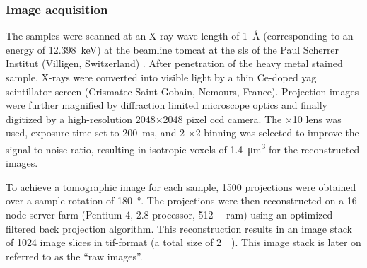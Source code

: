 \subsubsection{Image acquisition}
The samples were scanned at an X-ray wave-length of \SI{1}{\angstrom} (corresponding to an energy of \SI{12.398}{\kilo\electronvolt}) at the beamline \ac{tomcat} at the \acf{sls} of the Paul Scherrer Institut (Villigen, Switzerland) \cite{Stampanoni2002,Stampanoni2007}. After penetration of the heavy metal stained sample, X-rays were converted into visible light by a thin Ce-doped \acs{yag} scintillator screen (Crismatec Saint-Gobain, Nemours, France). Projection images were further magnified by diffraction limited microscope optics and finally digitized by a high-resolution 2048$\times$2048 pixel \ac{ccd} camera. The $\times$10 lens was used, exposure time set to \SI{200}{\milli\second}, and 2 $\times$2 binning was selected to improve the signal-to-noise ratio, resulting in isotropic voxels of \SI{1.4}{\micro\meter\cubed} for the reconstructed images.

To achieve a tomographic image for each sample, 1500 projections were obtained over a sample rotation of \SI{180}{\degree}. The projections were then reconstructed on a 16-node server farm (Pentium 4, \SI{2.8}{\gigahertz} processor, \SI{512}{\mega\byte} \acs{ram}) using an optimized filtered back projection algorithm. This reconstruction results in an image stack of 1024 image slices in tif-format (a total size of \SI{2}{\giga\byte}). This image stack is later on referred to as the ``raw images''.

